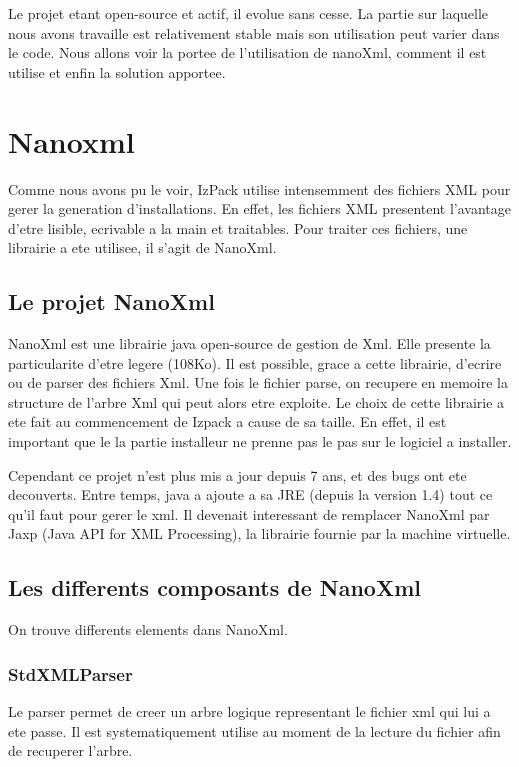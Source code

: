 Le projet etant open-source et actif, il evolue sans cesse. La partie sur laquelle nous avons travaille est relativement stable mais son utilisation peut varier dans le code. Nous allons voir la portee de l'utilisation de nanoXml, comment il est utilise et enfin la solution apportee.

\section{Nanoxml}
Comme nous avons pu le voir, IzPack utilise intensemment des fichiers XML pour gerer la generation d'installations. En effet, les fichiers XML presentent l'avantage d'etre lisible, ecrivable a la main et traitables. Pour traiter ces fichiers, une librairie a ete utilisee, il s'agit de NanoXml.
\subsection{Le projet NanoXml}
NanoXml est une librairie java open-source de gestion de Xml. Elle presente la particularite d'etre legere (108Ko). Il est possible, grace a cette librairie, d'ecrire ou de parser des fichiers Xml. Une fois le fichier parse, on recupere en memoire la structure de l'arbre Xml qui peut alors etre exploite. Le choix de cette librairie a ete fait au commencement de Izpack a cause de sa taille. En effet, il est important que le la partie installeur ne prenne pas le pas sur le logiciel a installer.

Cependant ce projet n'est plus mis a jour depuis 7 ans, et des bugs ont ete decouverts. Entre temps, java a ajoute a sa JRE (depuis la version 1.4) tout ce qu'il faut pour gerer le xml. Il devenait interessant de remplacer NanoXml par Jaxp (Java API for XML Processing), la librairie fournie par la machine virtuelle.
\subsection{Les differents composants de NanoXml}
On trouve differents elements dans NanoXml.
\subsubsection{StdXMLParser}
Le parser permet de creer un arbre logique representant le fichier xml qui lui a ete passe. Il est systematiquement utilise au moment de la lecture du fichier afin de recuperer l'arbre.
